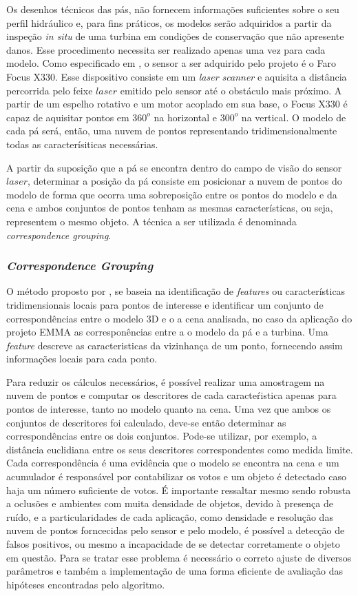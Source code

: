 Os desenhos técnicos das pás, não fornecem informações suficientes
sobre o seu perfil hidráulico e, para fins práticos, os modelos serão adquiridos
a partir da inspeção \textit{in situ} de uma turbina em condições de conservação
que não apresente danos. Esse procedimento necessita ser realizado apenas uma
vez para cada modelo. Como especificado em \cite{EMMA DETAIL}, %
o sensor a ser adquirido pelo projeto é o Faro Focus X330. Esse dispositivo
consiste em um \textit{laser scanner} e aquisita a distância percorrida pelo
feixe $laser$ emitido pelo sensor até o obstáculo mais próximo. A partir de um
espelho rotativo e um motor acoplado em sua base, o Focus X330 é capaz de
aquisitar pontos em $360^o$ na horizontal e $300^o$ na vertical. O modelo de
cada pá será, então, uma nuvem de pontos representando tridimensionalmente todas
as caracterísiticas necessárias.

A partir da suposição que a pá se encontra dentro do campo de visão do sensor
$laser$, determinar a posição da pá consiste em posicionar a nuvem de pontos do
modelo de forma que ocorra uma sobreposição entre os pontos do modelo e da cena
e ambos conjuntos de pontos tenham as mesmas características, ou seja,
representem o mesmo objeto. A técnica a ser utilizada é denominada
\textit{correspondence grouping}. 


\subsubsection{\textit{Correspondence Grouping}}
 
O método proposto por \cite{Tombari2010a}, se baseia na identificação de
\textit{features} ou características tridimensionais locais para pontos de
interesse e identificar um conjunto de correspondências entre o modelo 3D e o a
cena analisada, no caso da aplicação do projeto EMMA as corresponências entre a
o modelo da pá e a turbina. Uma \textit{feature} descreve as caracteristicas da
vizinhança de um ponto, fornecendo assim informações locais para cada ponto. 

Para reduzir os cálculos necessários, é possível realizar uma amostragem na
nuvem de pontos e computar os descritores de cada caracteŕistica apenas para
pontos de interesse, tanto no modelo quanto na cena. Uma vez que ambos os
conjuntos de descritores foi calculado, deve-se então determinar as
correspondências entre os dois conjuntos. Pode-se utilizar, por exemplo, a
distância euclidiana entre os seus descritores correspondentes como medida
limite. Cada correspondência é uma evidência que o modelo se encontra na cena e
um acumulador é responsável por contabilizar os votos e um objeto é detectado
caso haja um número suficiente de votos. É importante ressaltar mesmo sendo
robusta a oclusões e ambientes com muita densidade de objetos, devido à presença de
ruído, e a particularidades de cada aplicação, como densidade e resolução das
nuvem de pontos forncecidas pelo sensor e pelo modelo, é possível a detecção de
falsos positivos, ou mesmo a incapacidade de se detectar corretamente o objeto
em questão. Para se tratar esse problema é necessário o correto ajuste de
diversos parâmetros e também a implementação de uma forma eficiente de avaliação
das hipóteses encontradas pelo algoritmo. 


